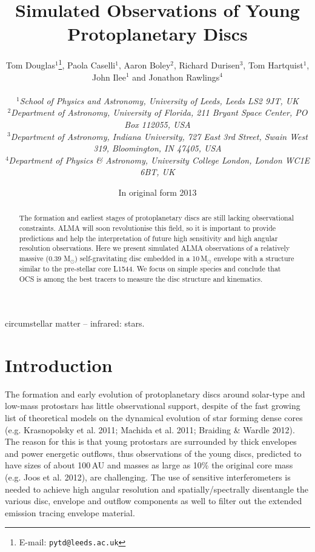 \documentclass[useAMS,usenatbib]{mn2e}
\title[Young protoplanetary discs]{Simulated Observations of Young Protoplanetary Discs}
\author[T.~A.~Douglas et al.]
{\parbox{\textwidth}{Tom Douglas$^{1}$\thanks{E-mail: \texttt{pytd@leeds.ac.uk}},
Paola Caselli$^{1}$,
Aaron Boley$^{2}$,
Richard Durisen$^{3}$,
Tom Hartquist$^{1}$,
John Ilee$^{1}$ and
Jonathon Rawlings$^{4}$\\
\vspace{0.1cm}\\
{\small{\it$^{1}$School of Physics and Astronomy, University of Leeds, Leeds LS2 9JT, UK}} \\
{\small{\it$^{2}$Department of Astronomy, University of Florida, 211 Bryant Space Center, PO Box 112055, USA}}\\
{\small{\it$^{3}$Department of Astronomy, Indiana University, 727 East 3rd Street, Swain West 319, Bloomington, IN 47405, USA}}\\
{\small{\it$^{4}$Department of Physics \& Astronomy, University College London, London WC1E 6BT, UK}}\\}}
\begin{document}
\date{In original form 2013}

\pagerange{\pageref{firstpage}--\pageref{lastpage}} 

\maketitle

\label{firstpage}

\begin{abstract}
The formation and earliest stages of protoplanetary discs are still lacking observational constraints. ALMA will soon revolutionise this field, so it is important to provide predictions and help the interpretation of future high sensitivity and high angular resolution observations. Here we present simulated ALMA observations of a relatively massive (0.39 M$_{\odot}$) self-gravitating disc embedded in a 10\,M$_{\odot}$ envelope with a structure similar to the pre-stellar core L1544. We focus on simple species and conclude that OCS is among the best tracers to measure the disc structure and kinematics. 
\end{abstract}

\begin{keywords}
circumstellar matter -- infrared: stars.
\end{keywords}

\section{Introduction}

The formation and early evolution of protoplanetary discs around solar-type and low-mass protostars has little observational support, despite of the fast growing list of theoretical models on the dynamical evolution of star forming dense cores (e.g. Krasnopolsky et al. 2011; Machida et al. 2011; Braiding \& Wardle 2012). The reason for this is that young protostars are surrounded by thick envelopes and power energetic outflows, thus observations of the young discs, predicted to have sizes of about 100\,AU and masses as large as 10\% the original core mass (e.g. Joos et al. 2012), are challenging. The use of sensitive interferometers is needed to achieve high angular resolution and spatially/spectrally disentangle the various disc, envelope and outflow components as well to filter out the extended emission tracing envelope material. 
\end{document}
